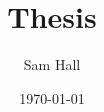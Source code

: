 \documentclass[11pt,a4paper]{report}
\title{Thesis}
\author{Sam Hall}
\date{\today}
\begin{document}
\linenumbers





%
\end{document}
